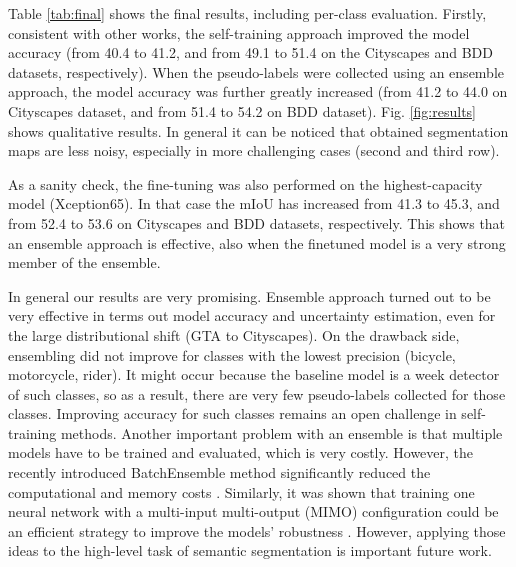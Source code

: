 \documentclass[conference]{IEEEtran}
\begin{document}
Table \ref{tab:final} shows the final results, including per-class evaluation. Firstly, consistent with other works, the self-training approach improved the model accuracy (from 40.4 to 41.2, and from 49.1 to 51.4 on the Cityscapes and BDD datasets, respectively). When the pseudo-labels were collected using an ensemble approach, the model accuracy was further greatly increased (from 41.2 to 44.0 on Cityscapes dataset, and from 51.4 to 54.2 on BDD dataset). Fig. \ref{fig:results} shows qualitative results. In general it can be noticed that obtained segmentation maps are less noisy, especially in more challenging cases (second and third row).

As a sanity check, the fine-tuning was also performed on the highest-capacity model (Xception65). In that case the mIoU has increased from 41.3 to 45.3, and from 52.4 to 53.6 on Cityscapes and BDD datasets, respectively. This shows that an ensemble approach is effective, also when the finetuned model is a very strong member of the ensemble.

In general our results are very promising. Ensemble approach turned out to be very effective in terms out model accuracy and uncertainty estimation, even for the large distributional shift (GTA to Cityscapes). On the drawback side, ensembling did not improve for classes with the lowest precision (bicycle, motorcycle, rider). It might occur because the baseline model is a week detector of such classes, so as a result, there are very few pseudo-labels collected for those classes. Improving accuracy for such classes remains an open challenge in self-training methods.
Another important problem with an ensemble is that multiple models have to be trained and evaluated, which is very costly. However, the recently introduced BatchEnsemble method significantly reduced the computational and memory costs \cite{batchensemble}. Similarly, it was shown that training one neural network with a multi-input multi-output (MIMO) configuration could be an efficient strategy to improve the models’ robustness \cite{mimo}. However, applying those ideas to the high-level task of semantic segmentation is important future work.


\end{document}
